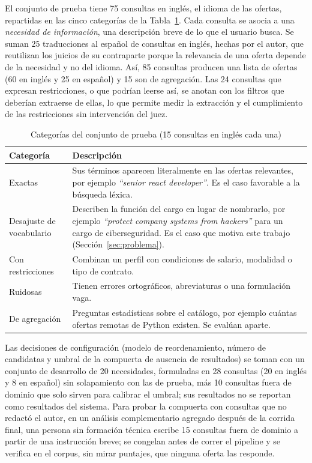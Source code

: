 El conjunto de prueba tiene 75 consultas en inglés, el idioma de las ofertas, repartidas en las cinco categorías de la Tabla~\ref{tab:met-categorias}. Cada consulta se asocia a una \emph{necesidad de información}, una descripción breve de lo que el usuario busca. Se suman 25 traducciones al español de consultas en inglés, hechas por el autor, que reutilizan los juicios de su contraparte porque la relevancia de una oferta depende de la necesidad y no del idioma. Así, 85 consultas producen una lista de ofertas (60 en inglés y 25 en español) y 15 son de agregación. Las 24 consultas que expresan restricciones, o que podrían leerse así, se anotan con los filtros que deberían extraerse de ellas, lo que permite medir la extracción y el cumplimiento de las restricciones sin intervención del juez.

\begin{table}[htbp!]
    \centering
    \caption{Categorías del conjunto de prueba (15 consultas en inglés cada una)}
    \label{tab:met-categorias}
    \small
    \begin{tabular}{|p{3.4cm}|p{10.8cm}|}
        \hline
        \textbf{Categoría} & \textbf{Descripción} \\
        \hline
        Exactas & Sus términos aparecen literalmente en las ofertas relevantes, por ejemplo \textit{\enquote{senior react developer}}. Es el caso favorable a la búsqueda léxica. \\
        \hline
        Desajuste de vocabulario & Describen la función del cargo en lugar de nombrarlo, por ejemplo \textit{\enquote{protect company systems from hackers}} para un cargo de ciberseguridad. Es el caso que motiva este trabajo (Sección~\ref{sec:problema}). \\
        \hline
        Con restricciones & Combinan un perfil con condiciones de salario, modalidad o tipo de contrato. \\
        \hline
        Ruidosas & Tienen errores ortográficos, abreviaturas o una formulación vaga. \\
        \hline
        De agregación & Preguntas estadísticas sobre el catálogo, por ejemplo cuántas ofertas remotas de Python existen. Se evalúan aparte. \\
        \hline
    \end{tabular}
\end{table}

Las decisiones de configuración (modelo de reordenamiento, número de candidatas y umbral de la compuerta de ausencia de resultados) se toman con un conjunto de desarrollo de 20 necesidades, formuladas en 28 consultas (20 en inglés y 8 en español) sin solapamiento con las de prueba, más 10 consultas fuera de dominio que solo sirven para calibrar el umbral; sus resultados no se reportan como resultados del sistema. Para probar la compuerta con consultas que no redactó el autor, en un análisis complementario agregado después de la corrida final, una persona sin formación técnica escribe 15 consultas fuera de dominio a partir de una instrucción breve; se congelan antes de correr el pipeline y se verifica en el corpus, sin mirar puntajes, que ninguna oferta las responde.

